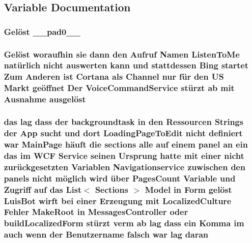 \subsection{Variable Documentation}
\subsubsection[{\texorpdfstring{\+\_\+\+\_\+pad0\+\_\+\+\_\+}{__pad0__}}]{\setlength{\rightskip}{0pt plus 5cm}Gelöst \+\_\+\+\_\+pad0\+\_\+\+\_\+}\hypertarget{_r_e_a_d_m_e_8txt_a38ccef022a886075e294ad30cbfcae20}{}\label{_r_e_a_d_m_e_8txt_a38ccef022a886075e294ad30cbfcae20}
\subsubsection[{\texorpdfstring{ausgelöst}{ausgelöst}}]{\setlength{\rightskip}{0pt plus 5cm}Gelöst woraufhin sie dann den Aufruf Namen Listen\+To\+Me natürlich nicht auswerten kann und stattdessen Bing startet Zum Anderen ist Cortana als Channel nur für den US Markt geöffnet Der Voice\+Command\+Service stürzt ab mit Ausnahme ausgelöst}\hypertarget{_r_e_a_d_m_e_8txt_ae87c321689a82617b1f79b2274e0c802}{}\label{_r_e_a_d_m_e_8txt_ae87c321689a82617b1f79b2274e0c802}
\subsubsection[{\texorpdfstring{daran}{daran}}]{\setlength{\rightskip}{0pt plus 5cm}das lag dass der backgroundtask in den Ressourcen Strings der App sucht und dort Loading\+Page\+To\+Edit nicht definiert {\bf war} Main\+Page häuft die sections alle auf einem panel an ein das im W\+CF Service seinen Ursprung hatte mit einer nicht zurückgesetzten Variablen Navigationservice zuwischen den panels nicht möglich wird über Pages\+Count Variable und Zugriff auf das List$<$ Sections $>$ Model in Form gelöst Luis\+Bot wirft bei einer Erzeugung mit Localized\+Culture Fehler Make\+Root in Messages\+Controller oder build\+Localized\+Form stürzt verm ab lag dass ein Komma im auch wenn der Benutzername falsch {\bf war} lag daran}\hypertarget{_r_e_a_d_m_e_8txt_a135543df2f8a787ac2ddeaf87194562c}{}\label{_r_e_a_d_m_e_8txt_a135543df2f8a787ac2ddeaf87194562c}
